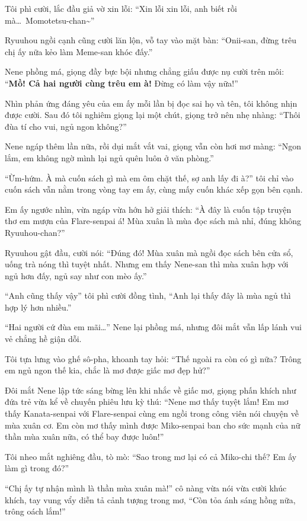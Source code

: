 \documentclass[../main.tex]{subfiles}
\begin{document}
Tôi phì cười, lắc đầu giả vờ xin lỗi: ``Xin lỗi xin lỗi, anh biết rồi mà\dots\ Momotetsu-chan\~{}''

Ryuuhou ngồi cạnh cũng cười lăn lộn, vỗ tay vào mặt bàn: ``Onii-san, đừng trêu chị ấy nữa kẻo làm Meme-san khóc đấy.''

Nene phồng má, giọng đầy bực bội nhưng chẳng giấu được nụ cười trên môi: ``\textbf{Mồ! Cả hai người cùng trêu em à!} Đừng có làm vậy nữa!''

Nhìn phản ứng đáng yêu của em ấy mỗi lần bị đọc sai họ và tên, tôi không nhịn được cười. Sau đó tôi nghiêm giọng lại một chút, giọng trở nên nhẹ nhàng: ``Thôi đùa tí cho vui, ngủ ngon không?''

Nene ngáp thêm lần nữa, rồi dụi mắt vắt vai, giọng vẫn còn hơi mơ màng: ``Ngon lắm, em không ngờ mình lại ngủ quên luôn ở văn phòng.''

``Ừm-hứm. À mà cuốn sách gì mà em ôm chặt thế, sợ anh lấy đi à?'' tôi chỉ vào cuốn sách vẫn nằm trong vòng tay em ấy, cùng mấy cuốn khác xếp gọn bên cạnh.

Em ấy ngước nhìn, vừa ngáp vừa hớn hở giải thích: ``À đây là cuốn tập truyện thơ em mượn của Flare-senpai á! Mùa xuân là mùa đọc sách mà nhỉ, đúng không Ryuuhou-chan?''

Ryuuhou gật đầu, cười nói: ``Đúng đó! Mùa xuân mà ngồi đọc sách bên cửa sổ, uống trà nóng thì tuyệt nhất. Nhưng em thấy Nene-san thì mùa xuân hợp với ngủ hơn đấy, ngủ say như con mèo ấy.''

``Anh cũng thấy vậy'' tôi phì cười đồng tình, ``Anh lại thấy đây là mùa ngủ thì hợp lý hơn nhiều.''

``Hai người cứ đùa em mãi\dots'' Nene lại phồng má, nhưng đôi mắt vẫn lấp lánh vui vẻ chẳng hề giận dỗi.

Tôi tựa lưng vào ghế sô-pha, khoanh tay hỏi: ``Thế ngoài ra còn có gì nữa? Trông em ngủ ngon thế kia, chắc là mơ được giấc mơ đẹp hử?''

Đôi mắt Nene lập tức sáng bừng lên khi nhắc về giấc mơ, giọng phấn khích như đứa trẻ vừa kể về chuyến phiêu lưu kỳ thú: ``Nene mơ thấy tuyệt lắm! Em mơ thấy Kanata-senpai với Flare-senpai cùng em ngồi trong công viên nói chuyện về mùa xuân cơ. Em còn mơ thấy mình được Miko-senpai ban cho sức mạnh của nữ thần mùa xuân nữa, có thể bay được luôn!''

Tôi nheo mắt nghiêng đầu, tò mò: ``Sao trong mơ lại có cả Miko-chi thế? Em ấy làm gì trong đó?''

``Chị ấy tự nhận mình là thần mùa xuân mà!'' cô nàng vừa nói vừa cười khúc khích, tay vung vẩy diễn tả cảnh tượng trong mơ, ``Còn tỏa ánh sáng hồng nữa, trông oách lắm!''
\end{document}
